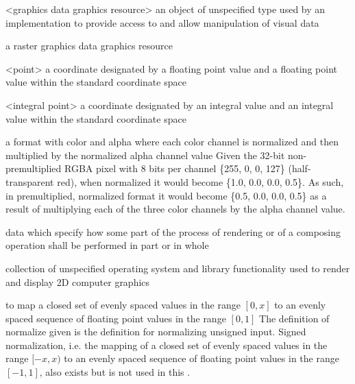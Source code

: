 <graphics data graphics resource> an object of unspecified type used by an implementation to provide access to and allow manipulation of visual data

\indexdefn{\pixmap}
a raster graphics data graphics resource

<point> a coordinate designated by a floating point \xaxis{} value and a floating point \yaxis{} value within the standard coordinate space

<integral point> a coordinate designated by an integral \xaxis{} value and an integral \yaxis{} value within the standard coordinate space

a format with color and alpha where each color channel is normalized and then 
multiplied by the normalized alpha channel value
\enterexample
Given the 32-bit non-premultiplied RGBA pixel with 8 bits per channel \{255, 0, 
0, 127\} (half-transparent red), when normalized it would become \{1.0, 0.0, 
0.0, 0.5\}. As such, in premultiplied, normalized format it would become \{0.5, 
0.0, 0.0, 0.5\} as a result of multiplying each of the three color channels by 
the alpha channel value.
\exitexample

data which specify how some part of the process of rendering or of a composing operation shall be performed in part or in whole

collection of unspecified operating system and library functionality used to render and display 2D computer graphics

to map a closed set of evenly spaced values in the range $[0, x]$ to an evenly spaced sequence of floating point values in the range $[0, 1]$
\enternote
The definition of normalize given is the definition for normalizing unsigned input. Signed normalization, i.e. the mapping of a closed set of evenly spaced values in the range $[-x, x)$ to an evenly spaced sequence of floating point values in the range $[-1, 1]$, also exists but is not used in this \documenttypename{}.
\exitnote

